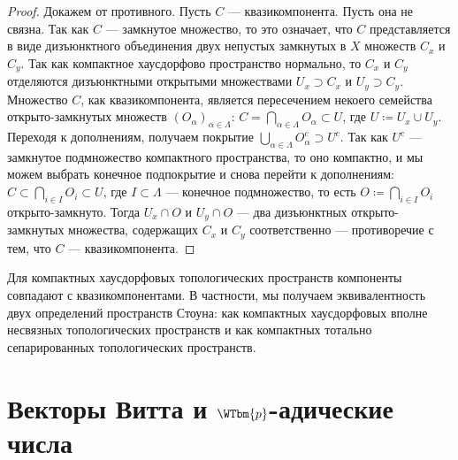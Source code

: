 \documentclass[
	extrafontsizes,
	11pt,
	hyphens,
]{memoir}
\begin{document}
\begin{proof}
Докажем от противного.
Пусть $C$ --- квазикомпонента. Пусть она не связна. Так как $C$ --- замкнутое множество, то это означает, что $C$ представляется в виде дизъюнктного объединения двух непустых замкнутых в $X$ множеств $C_x$ и $C_y$. Так как компактное хаусдорфово пространство нормально, то $C_x$ и $C_y$ отделяются дизъюнктными открытыми множествами $U_x \supset C_x$ и $U_y \supset C_y$. Множество $C$, как квазикомпонента, является пересечением некоего семейства открыто-зам\-кну\-тых множеств $(O_\alpha)_{\alpha \in \Lambda}$: $C = \bigcap_{\alpha \in \Lambda} O_\alpha \subset U$, где $U \coloneqq U_x \cup U_y$. Переходя к дополнениям, получаем покрытие $\bigcup_{{\alpha \in \Lambda}} O_\alpha^c \supset U^c$. Так как $U^c$ --- замкнутое подмножество компактного пространства, то оно компактно, и мы можем выбрать конечное подпокрытие и снова перейти к дополнениям: $C \subset \bigcap_{i \in I} O_i \subset U$, где \(I \subset \Lambda\) --- конечное подмножество, то есть $O \coloneqq \bigcap_{i \in I} O_i$ открыто-замкнуто. Тогда $U_x \cap O$ и $U_y \cap O$ --- два дизъюнктных открыто-замкнутых множества, содержащих $C_x$ и $C_y$ соответственно --- противоречие с тем, что $C$ --- квазикомпонента.
\end{proof}

\begin{corollary}
Для компактных хаусдорфовых топологических пространств компоненты совпадают с квазикомпонентами. В частности, мы получаем эквивалентность двух определений пространств Стоуна: как компактных хаусдорфовых вполне несвязных топологических пространств и как компактных тотально сепарированных топологических пространств.
\end{corollary}



\section{Векторы Витта и \texorpdfstring{\(\WTbm{p}\)-адические}{p-адические} числа}

\end{document}
